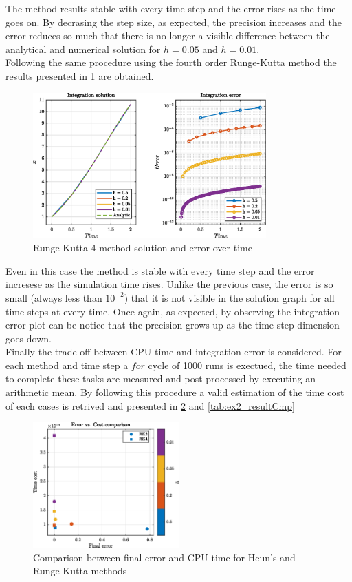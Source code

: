 \documentclass[11pt,a4paper,oneside]{article}
\begin{document}
The method results stable with every time step and the error rises as the time goes on.
By decrasing the step size, as expected, the precision increases and the error reduces so much that there is no longer a visible difference between the analytical and numerical solution for $h=0.05$ and $h=0.01$.  
\\
Following the same procedure using the fourth order Runge-Kutta method the results presented in \cref{fig:ex2_rk4} are obtained.

\begin{figure}[htb]
    \centering
    \includegraphics*[width=0.8\textwidth, keepaspectratio]{ex2_rk4.eps}
    \caption[]{\label{fig:ex2_rk4} Runge-Kutta 4 method solution and error over time}
\end{figure}

Even in this case the method is stable with every time step and the error incresese as the simulation time rises.
Unlike the previous case, the error is so small (always less than $10^{-2}$) that it is not visible in the solution graph for all time steps at every time.
Once again, as expected, by observing the integration error plot can be notice that the precision grows up as the time step dimension goes down. 
\\
Finally the trade off between CPU time and integration error is considered. For each method and time step a $for$ cycle of 1000 runs is exectued, the time needed to complete these tasks are measured and post processed by executing an arithmetic mean.
By following this procedure a valid estimation of the time cost of each cases is retrived and presented in \cref{fig:ex2_error} and \cref{tab:ex2_resultCmp}

\begin{figure}[htb]
    \centering
    \includegraphics*[width=0.5\textwidth, keepaspectratio]{ex2_error.eps}
    \caption[]{\label{fig:ex2_error} Comparison between final error and CPU time for Heun's and Runge-Kutta methods}
\end{figure}
\end{document}
